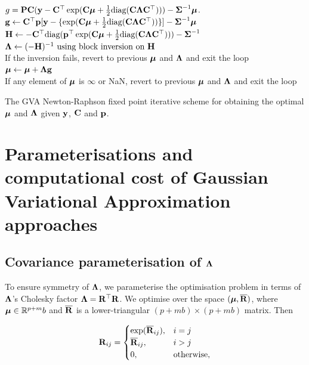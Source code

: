 \begin{algorithm}
	\begin{algorithmic}
		\REQUIRE $g = {\bf P} {\bf C} ({\bf y} - {\bf C}^\top \exp({\bf C} {\boldsymbol \mu} + \tfrac{1}{2} \text{diag}{({\bf C}{\boldsymbol\Lambda}{\bf C}^\top)})) - {\boldsymbol \Sigma}^{-1} {\boldsymbol \mu}$.
			\STATE ${\bf g} \leftarrow {\bf C}^\top {\bf p} [{\bf y} - \{ \exp({\bf C} {\boldsymbol \mu} + \tfrac{1}{2} \text{diag}({\bf C} {\boldsymbol \Lambda} {\bf C}^\top)) \}] - {\boldsymbol \Sigma}^{-1} {\boldsymbol \mu}$ \\
			\STATE ${\bf H} \leftarrow -{\bf C}^\top \text{diag}({\bf p}^\top \exp({\bf C} {\boldsymbol \mu} + \tfrac{1}{2} \text{diag}({\bf C} {\boldsymbol \Lambda} {\bf C}^\top))) - {\boldsymbol \Sigma}^{-1}$ \\
			\STATE ${\boldsymbol \Lambda} \leftarrow (-{\bf H})^{-1} \text{ using block inversion on } {\bf H}$ \\
			If the inversion fails, revert to previous ${\boldsymbol \mu}$ and ${\boldsymbol \Lambda}$ and exit the loop \\
			\STATE ${\boldsymbol \mu} \leftarrow {\boldsymbol\mu} + {\boldsymbol \Lambda} {\bf g}$ \\
			If any element of ${\boldsymbol \mu}$ is $\infty$ or NaN, revert to previous ${\boldsymbol \mu}$ and ${\boldsymbol \Lambda}$ and exit the loop
		\ENDWHILE
	\end{algorithmic}
	\caption{The GVA Newton-Raphson fixed point iterative scheme for obtaining the optimal ${\boldsymbol \mu}$ and ${\boldsymbol \Lambda}$
		given ${\bf y}$, ${\bf C}$ and ${\bf p}$.}
	\label{alg:algorithm_nr}
\end{algorithm}
		
		
\section{Parameterisations and computational cost of Gaussian Variational Approximation approaches}
\label{sec:param}
\subsection{Covariance parameterisation of ${\boldsymbol \Lambda}$}

To ensure symmetry of ${\boldsymbol \Lambda}$, we parameterise the optimisation problem in terms of ${\boldsymbol \Lambda}$'s
Cholesky factor  ${\boldsymbol \Lambda} = {\bf R}^\top {\bf R}$. We optimise over the space $({\boldsymbol \mu}, \overline{{\bf R}})$, where ${\boldsymbol \mu}
\in {\mathbb{R}}^{p + m}b$ and $\overline{{\bf R}}$ is a lower-triangular $(p + mb) \times (p + mb)$ matrix. Then
		
\begin{equation*}
	{\bf R}_{ij} =
	\begin{cases}
		\exp(\overline{{\bf R}}_{ij}), & i = j             \\
		\overline{{\bf R}}_{ij},       & i > j             \\
		0,                         & \text{otherwise}, 
	\end{cases}
\end{equation*}
		

